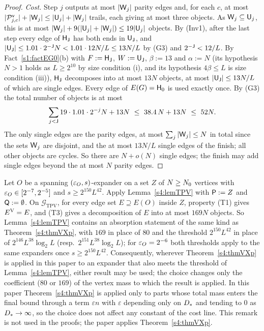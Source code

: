 \begin{proof}
\emph{Cost.} Step $j$ outputs at most $|\mathsf{W}_j|$ parity edges and, for each $c$, at most
$|\mathcal{P}^{\mathsf{v}}_{j,c}|+|\mathsf{W}_j|\le|\mathsf{U}_j|+|\mathsf{W}_j|$ trails, each giving at most three objects. As $\mathsf{W}_j\subseteq\mathsf{U}_j$, this
is at most $|\mathsf{W}_j|+9(|\mathsf{U}_j|+|\mathsf{W}_j|)\le19|\mathsf{U}_j|$ objects. By (Inv1), after the last step every edge of
$\mathsf{H}_{\mathsf{J}}$ has both ends in $\mathsf{U}_{\mathsf{J}}$, and $|\mathsf{U}_{\mathsf{J}}|\le1.01\cdot2^{-\mathsf{J}}N<1.01\cdot12N/L\le13N/L$ by (G3) and
$2^{-\mathsf{J}}<12/L$. By Fact~\ref{s1:factEG0}(b) with $F:=\mathsf{H}_{\mathsf{J}}$, $W:=\mathsf{U}_{\mathsf{J}}$, $\beta:=13$ and $\alpha:=N$ (its hypothesis $N>1$ holds as $L\ge2^{10}$ by
size condition (i), and its hypothesis $4\beta\le L$ is size condition (iii)), $\mathsf{H}_{\mathsf{J}}$ decomposes into at most $13N$ objects, at most $|\mathsf{U}_{\mathsf{J}}|\le13N/L$ of which are
single edges. Every edge of $E(G)=\mathsf{H}_0$ is used exactly once. By (G3) the total number of objects is at most
\[
\sum_{j<\vJ}19\cdot1.01\cdot2^{-j}N+13N\ \le\ 38.4\,N+13N\ \le\ 52N .
\]
The only single edges are the parity edges, at most
$\sum_j|\mathsf{W}_j|\le N$ in total since the sets $\mathsf{W}_j$ are disjoint, and the at most $13N/L$ single edges of the
finish; all other objects are cycles. So there are $N+o(N)$ single edges; the finish may add single edges
beyond the at most $N$ parity edges.
\end{proof}

\begin{remark}\label{s4:remTPVVX}
Let $O$ be a spanning $(\varepsilon_O,s)$-expander on a set $Z$ of $N\ge N_{0}$ vertices with $\varepsilon_O\in[2^{-7},2^{-5}]$ and
$s\ge2^{150}L^{42}$. Apply Lemma~\ref{s4:lemTPV} with $\mathsf{P}:=Z$ and $\mathsf{Q}:=\emptyset$. On
$\mathcal G_{\mathrm{TPV}}$, for every edge set $E\supseteq E(O)$ inside $Z$, property (T1) gives $E^{\mathrm{V}}=E$, and (T3)
gives a decomposition of $E$ into at most $169N$ objects. So Lemma~\ref{s4:lemTPV} contains an absorption statement of
the same kind as Theorem~\ref{s4:thmVXp}, with $169$ in place of $80$ and the threshold $2^{150}L^{42}$ in place of
$2^{146}L^{38}\log_2L$ (resp.\ $2^{151}L^{38}\log_2L$); for $\varepsilon_O=2^{-6}$ both thresholds apply to the same
expanders once $s\ge2^{150}L^{42}$. Consequently, wherever Theorem~\ref{s4:thmVXp} is applied in this paper to an
expander that also meets the threshold of Lemma~\ref{s4:lemTPV}, either result may be used; the choice changes only
the coefficient ($80$ or $169$) of the vertex mass to which the result is applied. In this paper
Theorem~\ref{s4:thmVXp} is applied only to parts whose total mass enters the final bound through a term $\varepsilon n$ with
$\varepsilon$ depending only on $D_{*}$ and tending to $0$ as $D_{*}\to\infty$, so the choice does not affect any constant of the cost line. This remark is not used in the proofs; the
paper applies Theorem~\ref{s4:thmVXp}.
\end{remark}
